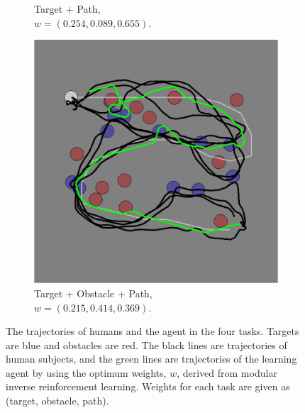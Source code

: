 \documentclass[11pt]{article} %
\begin{document}
\begin{figure}[h]
\begin{subfigure}[b]{0.24\textwidth}
\caption{Target + Path, \\$w = (0.254, 0.089, 0.655)$. }
\end{subfigure}
\begin{subfigure}[b]{0.24\textwidth}
\includegraphics[width=\textwidth]{task_4.png}
\caption{Target + Obstacle + Path, \\$w = (0.215, 0.414, 0.369)$. }
\end{subfigure}
\caption{The trajectories of humans and the agent in the four tasks. Targets are blue and obstacles are red. The
black lines are trajectories of human subjects, and the green lines are
trajectories of the learning agent by using the optimum weights, $w$, derived
from modular inverse reinforcement learning. Weights for each task are given as (target,
obstacle, path).}

\label{fig:exp}
\end{figure}
\end{document}

